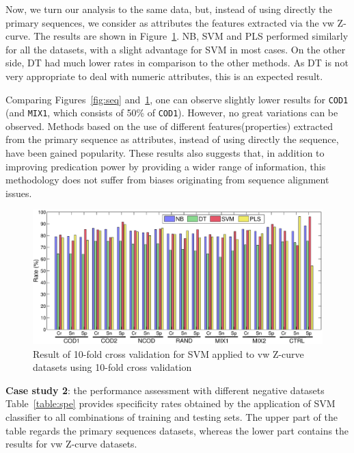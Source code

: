 \documentclass[runningheads,a4paper]{llncs}
\begin{document}
Now, we turn our analysis to the same data, but, instead of using directly the primary sequences, we  consider as attributes  the features extracted via the vw  Z-curve. The results are shown in Figure~\ref{fig:zcurve}.  NB, SVM and PLS performed similarly for all the datasets, with a slight advantage for SVM in most cases. On the other side, DT had much lower rates in comparison to the other methods. As DT is not very appropriate to deal with numeric attributes, this is an expected result. 

Comparing Figures~\ref{fig:seq} and~\ref{fig:zcurve}, one can observe slightly lower results for {\tt COD1}  (and {\tt MIX1}, which consists of 50\% of {\tt COD1}). However, no great variations can be observed. Methods based on the use of different  features(properties)  extracted from the primary sequence as attributes, instead of using directly the sequence,  have been gained popularity.  These results also suggests that, in addition to improving predication power by providing a wider range of information, this methodology does not suffer from biases originating from sequence alignment issues. \\

\begin{figure}
\vspace{0.0cm}
    \centering
    \includegraphics[width=1.0\textwidth]{Figs/Fig2.eps}
    \caption{Result of 10-fold cross validation for  SVM applied to vw Z-curve datasets using 10-fold cross validation  \label{fig:zcurve}}
   
\vspace{0.0cm}
\end{figure}

\noindent
{\bf Case study 2}: the performance assessment with different negative datasets \\

Table~\ref{table:spe} provides specificity rates obtained by the application of SVM classifier to all combinations of training and testing sets. The upper part of the table regards the primary sequences datasets, whereas the lower part contains the results for vw Z-curve datasets. 
\end{document}
